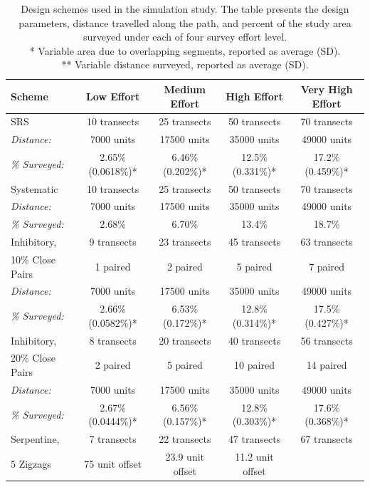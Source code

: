 \documentclass[review]{elsarticle}
\begin{document}
\begin{table}
\caption{Design schemes used in the simulation study. The table presents the
design parameters, distance travelled along the path, and percent of the study
area surveyed under each of four survey effort level.\\
* Variable area due to overlapping segments, reported as average (SD).\\
** Variable distance surveyed, reported as average (SD).}
\label{designtable}
\tiny
\begin{tabular}{|l|c|c|c|c|}
\hline
Scheme
&
Low Effort
&
Medium Effort
&
High Effort
&
Very High Effort
\\
\hline
SRS
&
10 transects
&
25 transects
&
50 transects
&
70 transects
\\
\hfill\emph{Distance:}
&
7000 units
&
17500 units
&
35000 units
&
49000 units
\\
\hfill\emph{\% Surveyed:}
&
2.65\% (0.0618\%)*
&
6.46\% (0.202\%)*
&
12.5\% (0.331\%)*
&
17.2\% (0.459\%)*
\\
\hline
Systematic
&
10 transects
&
25 transects
&
50 transects
&
70 transects
\\
\hfill\emph{Distance:}
&
7000 units
&
17500 units
&
35000 units
&
49000 units
\\
\hfill\emph{\% Surveyed:}
&
2.68\%
&
6.70\%
&
13.4\%
&
18.7\%
\\
\hline
Inhibitory,
&
9 transects
&
23 transects
&
45 transects
&
63 transects
\\
10\% Close Pairs
&
1 paired
&
2 paired
&
5 paired
&
7 paired
\\
\hfill\emph{Distance:}
&
7000 units
&
17500 units
&
35000 units
&
49000 units
\\
\hfill\emph{\% Surveyed:}
&
2.66\% (0.0582\%)*
&
6.53\% (0.172\%)*
&
12.8\% (0.314\%)*
&
17.5\% (0.427\%)*
\\
\hline
Inhibitory,
&
8 transects
&
20 transects
&
40 transects
&
56 transects
\\
20\% Close Pairs
&
2 paired
&
5 paired
&
10 paired
&
14 paired
\\
\hfill\emph{Distance:}
&
7000 units
&
17500 units
&
35000 units
&
49000 units
\\
\hfill\emph{\% Surveyed:}
&
2.67\% (0.0444\%)*
&
6.56\% (0.157\%)*
&
12.8\% (0.303\%)*
&
17.6\% (0.368\%)*
\\
\hline
Serpentine,
&
7 transects
&
22 transects
&
47 transects
&
67 transects
\\
5 Zigzags
&
75 unit offset
&
23.9 unit offset
&
11.2 unit offset

\end{tabular}
\end{table}
\end{document}
